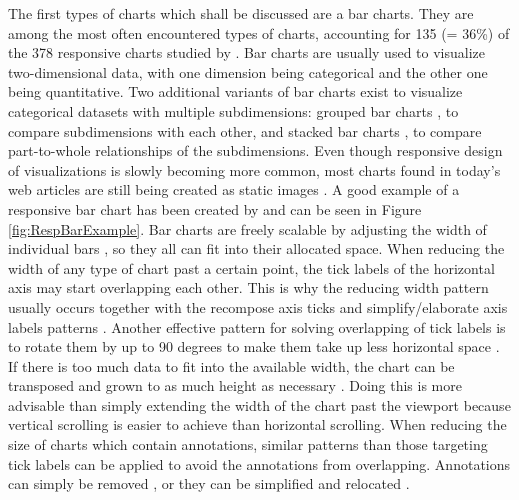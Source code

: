 The first types of charts which shall be discussed are a bar charts.
They are among the most often encountered types of charts, accounting for 135 (= 36\%) of the 378 responsive charts studied by \cite{DesignPatternsTradeOffsRespVis}.
Bar charts are usually used to visualize two-dimensional data, with one dimension being categorical and the other one being quantitative.
Two additional variants of bar charts exist to visualize categorical datasets with multiple subdimensions: grouped bar charts \parencite{GroupedBar}, to compare subdimensions with each other, and stacked bar charts \parencite{StackedBar}, to compare part-to-whole relationships of the subdimensions.
Even though responsive design of visualizations is slowly becoming more common, most charts found in today's web articles are still being created as static images \parencite{HBar,VBar,HVBar,MapBarLine}.
A good example of a responsive bar chart has been created by \cite{RespVis} and can be seen in Figure \ref{fig:RespBarExample}.
Bar charts are freely scalable by adjusting the width of individual bars \parencite{RespHBar,RespHBarHLine,RespHBars}, so they all can fit into their allocated space.
When reducing the width of any type of chart past a certain point, the tick labels of the horizontal axis may start overlapping each other.
This is why the reducing width pattern usually occurs together with the recompose axis ticks and simplify/elaborate axis labels patterns \parencite{RespHBars,RespHBarHLine,RespVBar}.
Another effective pattern for solving overlapping of tick labels is to rotate them by up to 90 degrees to make them take up less horizontal space \parencite{RespVis}.
If there is too much data to fit into the available width, the chart can be transposed and grown to as much height as necessary \parencite{RespVis}.
Doing this is more advisable than simply extending the width of the chart past the viewport because vertical scrolling is easier to achieve than horizontal scrolling.
When reducing the size of charts which contain annotations, similar patterns than those targeting tick labels can be applied to avoid the annotations from overlapping.
Annotations can simply be removed \parencite{RespHStackedBar,RespHLineHStackedBar}, or they can be simplified and relocated \parencite{RespVBar}.

